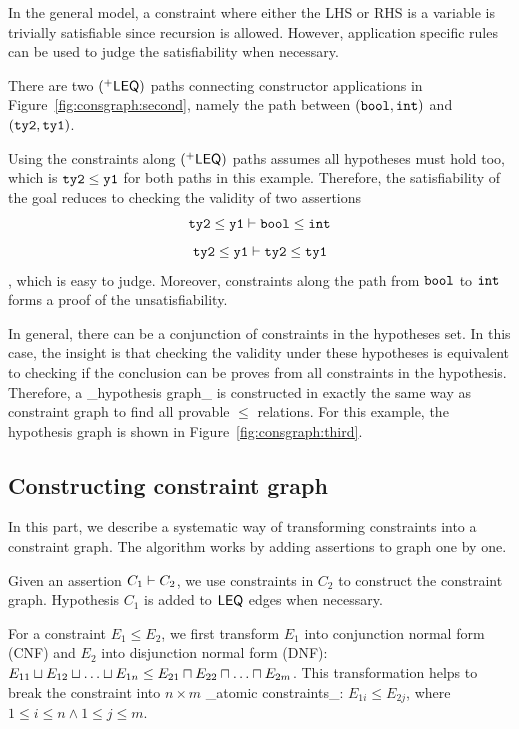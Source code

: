 In the general model, a constraint where either the LHS or RHS is a
variable is trivially satisfiable since recursion is allowed. However,
application specific rules can be used to judge the satisfiability
when necessary.

There are two $(^{+}\mathsf{LEQ})$ paths connecting constructor
applications in Figure~\ref{fig:consgraph:second}, namely the path
between $(\mathtt{bool, int})$ and $(\mathtt{ty2, ty1})$. 

Using the constraints along $(^{+}\mathsf{LEQ})$ paths assumes all
hypotheses must hold too, which is $\mathtt{ty2}\leq \mathtt{y1}$ for
both paths in this example. Therefore, the satisfiability of the goal
reduces to checking the validity of two assertions 
%
\[\mathtt{ty2}\leq \mathtt{y1}\vdash \mathtt{bool}\leq \mathtt{int}\]
\[\mathtt{ty2}\leq \mathtt{y1}\vdash \mathtt{ty2}\leq \mathtt{ty1}\]
, which is easy to judge. Moreover, constraints along the path from
$\mathtt{bool}$ to $\mathtt{int}$ forms a proof of the unsatisfiability.

In general, there can be a conjunction of constraints in the
hypotheses set. In this case, the insight is that checking the
validity under these hypotheses is equivalent to checking if the
conclusion can be proves from all constraints in the hypothesis.
Therefore, a _hypothesis graph_ is constructed in exactly the same
way as constraint graph to find all provable $\leq$ relations. For
this example, the hypothesis graph is shown in
Figure~\ref{fig:consgraph:third}. 

\subsection{Constructing constraint graph}
\label{sec:consgraph}

In this part, we describe a systematic way of transforming constraints
into a constraint graph. The algorithm works by adding assertions to
graph one by one.

Given an assertion $C_1 \vdash C_2$, we use constraints in $C_2$ to
construct the constraint graph. Hypothesis $C_1$ is added to $\mathsf{LEQ}$
edges when necessary.

For a constraint $E_1 \leq E_2$, we first transform $E_1$ into
conjunction normal form (CNF) and $E_2$ into disjunction normal form
(DNF): $E_{11}\join E_{12} \join \dots \join E_{1n} \leq E_{21}\meet
E_{22} \meet \dots \meet E_{2m}$. This transformation helps to break
the constraint into $n\times m$ _atomic constraints_: $E_{1i}\leq
E_{2j}$, where $1\leq i\leq n \land 1\leq j\leq m$.

